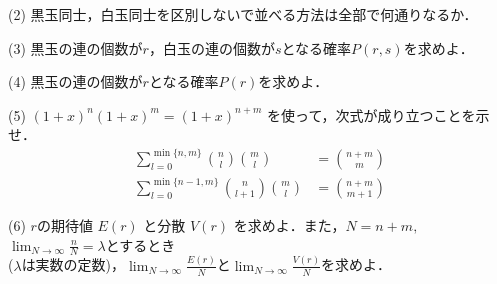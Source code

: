 \documentclass[a4j]{jarticle}
\let \ds \displaystyle
\begin{document}
\begin{screen}
 (2) 黒玉同士，白玉同士を区別しないで並べる方法は全部で何通りなるか．
\end{screen}

\begin{screen}
 (3) 黒玉の連の個数が$r$，白玉の連の個数が$s$となる確率$P(r,s)$を求めよ．
\end{screen}

\begin{screen}
 (4) 黒玉の連の個数が$r$となる確率$P(r)$を求めよ．
\end{screen}

\begin{screen}
 (5) $(1+x)^n(1+x)^m = (1+x)^{n+m}$ を使って，次式が成り立つことを示せ．
 \begin{align*}
  \sum_{l=0}^{\min\{n,m\}}\binom{n}{l}\binom{m}{l} &= \binom{n+m}{m} \tag{3.1} \\
  \sum_{l=0}^{\min\{n-1,m\}} \binom{n}{l+1}\binom{m}{l} &= \binom{n+m}{m+1} \tag{3.2}
 \end{align*}
\end{screen}

\begin{screen}
 (6) $r$の期待値 $E(r)$ と分散 $V(r)$ を求めよ．また，$N=n+m,$ $\ds \lim_{N \rightarrow \infty}\frac{n}{N} = \lambda$とするとき \\ ($\lambda$は実数の定数)，$\ds \lim_{N \rightarrow \infty}\frac{E(r)}{N}$と$\ds \lim_{N \rightarrow \infty}\frac{V(r)}{N}$を求めよ．

\end{screen}
\end{document}
